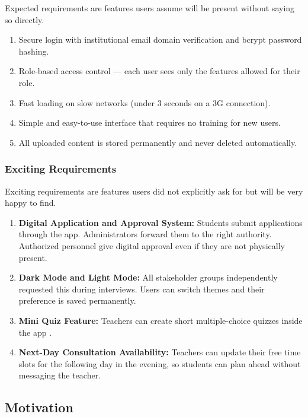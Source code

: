 \documentclass[12pt,a4paper]{article}
\begin{document}
Expected requirements are features users assume will be present without saying so directly.

\begin{enumerate}[leftmargin=*, label=\textbf{\arabic*.}, itemsep=3pt]
  \item Secure login with institutional email domain verification and bcrypt password hashing.
  \item Role-based access control --- each user sees only the features allowed for their role.
  \item Fast loading on slow networks (under 3 seconds on a 3G connection).
  \item Simple and easy-to-use interface that requires no training for new users.
  \item All uploaded content is stored permanently and never deleted automatically.
\end{enumerate}

\subsubsection{Exciting Requirements}

Exciting requirements are features users did not explicitly ask for but will be very happy to find.

\begin{enumerate}[leftmargin=*, label=\textbf{\arabic*.}, itemsep=3pt]
  \item \textbf{Digital Application and Approval System:} Students submit applications through the app. Administrators forward them to the right authority. Authorized personnel give digital approval even if they are not physically present.
  \item \textbf{Dark Mode and Light Mode:} All stakeholder groups independently requested this during interviews. Users can switch themes and their preference is saved permanently.
  \item \textbf{Mini Quiz Feature:} Teachers can create short multiple-choice quizzes inside the app .
  \item \textbf{Next-Day Consultation Availability:} Teachers can update their free time slots for the following day in the evening, so students can plan ahead without messaging the teacher.
\end{enumerate}

\subsection{Motivation}
\end{document}
